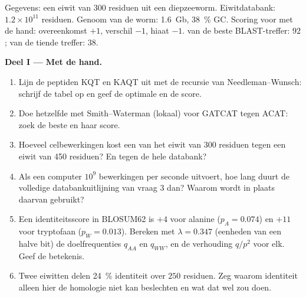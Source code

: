 \begin{problem}
\label{pb:b3:bioinformatics:1}
Gegevens: een eiwit van \num{300} residuen uit een diepzeeworm.
Eiwitdatabank: $1.2\times 10^{11}$ residuen. Genoom van de worm:
\qty{1.6}{Gb}, \qty{38}{\%} GC. Scoring voor  met de hand:
overeenkomst $+1$, verschil $-1$, hiaat $-1$.  van de beste
BLAST-treffer: $92$; van de tiende treffer: $38$.

\medskip
\noindent\textbf{Deel I --- Met de hand.}
\begin{enumerate}
  \item Lijn de peptiden KQT en KAQT uit met de recursie van
        Needleman--Wunsch: schrijf de tabel op en geef de optimale
         en de score.
  \item Doe hetzelfde met Smith--Waterman (lokaal) voor GATCAT tegen
        ACAT: zoek de beste  en haar score.
  \item Hoeveel celbewerkingen kost een  van het
        eiwit van \num{300} residuen tegen een eiwit van \num{450}
        residuen? En tegen de hele databank?
  \item Als een computer $10^{9}$ bewerkingen per seconde uitvoert, hoe
        lang duurt de volledige databankuitlijning van vraag 3 dan?
        Waarom wordt in plaats daarvan  gebruikt?
  \item Een identiteitsscore in BLOSUM62 is $+4$ voor alanine ($p_{A} =
        0.074$) en $+11$ voor tryptofaan ($p_{W} = 0.013$). Bereken met
        $\lambda = 0.347$ (eenheden van een halve bit) de
        doelfrequenties $q_{AA}$ en $q_{WW}$, en de verhouding
        $q/p^{2}$ voor elk. Geef de betekenis.
  \item Twee eiwitten delen \qty{24}{\%} identiteit over $250$ residuen.
        Zeg waarom identiteit alleen hier de homologie niet kan
        beslechten en wat dat wel zou doen.
\end{enumerate}


\end{problem}
